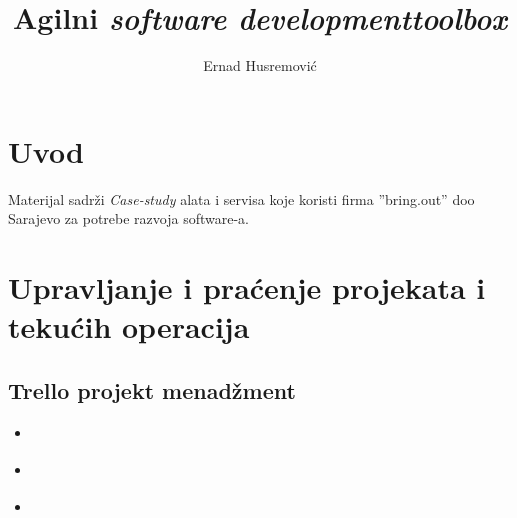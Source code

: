 \documentclass[times, utf8, seminar]{fit}
\begin{document}
\setlength{\parindent}{0pt}


\title{Agilni \emph{software development}\newline \emph{toolbox}}

\author{Ernad Husremović}

\maketitle

\tableofcontents

\newpage

%
%


\chapter{Uvod}

Materijal sadrži \emph{Case-study}  alata i servisa koje koristi firma ''bring.out'' doo Sarajevo za potrebe razvoja software-a.

\chapter{Upravljanje i praćenje projekata i tekućih operacija}

\section{Trello projekt menadžment}

\begin{itemize}
      \item \href{https://trello.com/board/f18-knowhow-erp/50af43adf5c6f78820000223}{\color{blue}{F18 trello}}
      \item \href{https://trello.com/board/agilni-toolset-infrastruktura/50af48a4c8ddb2bf32012f47}{\color{blue}{Agilni toolset}}
      \item \href{https://trello.com/board/r-d/50af8dd450a1b0e36a0056fb}{\color{blue}{Research \& development (R\&D)}}
\end{itemize}
\end{document}

